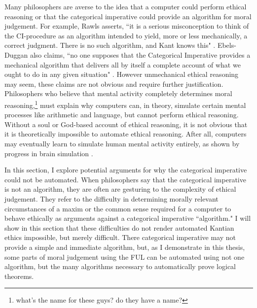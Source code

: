 %
\begin{isabellebody}%
%
%
\isadelimtheory
%
\endisadelimtheory
%
\isatagtheory
%
\endisatagtheory
{\isafoldtheory}%
%
\isadelimtheory
%
\endisadelimtheory
%
\isadelimdocument
%
\endisadelimdocument
%
\isatagdocument
%
\isamarkuptrue%
%
\endisatagdocument
{\isafolddocument}%
%
\isadelimdocument
%
\endisadelimdocument
%
\begin{isamarkuptext}%
Many philosophers are averse to the idea that a computer could perform ethical 
reasoning or that the categorical imperative could provide an algorithm for
moral judgement. For example, Rawls asserts, ``it is a serious misconception to think of the CI-procedure 
as an algorithm intended to yield, more or less mechanically, a correct judgment. There is no such 
algorithm, and Kant knows this" \citep[166]{rawlslectures}. Ebels-Duggan also claims, ``no one supposes that the Categorical
Imperative provides a mechanical algorithm that delivers all by itself a complete account of what we 
ought to do in any given situation" \citep[174]{ebelsduggan}. However unmechanical ethical reasoning
may seem, these claims are not obvious and require further justification. Philosophers who believe 
that mental activity completely determines moral reasoning,\footnote{what's the name for these
guys? do they have a name?} must explain why computers can, in theory, simulate certain mental processes like arithmetic 
and language, but cannot perform ethical reasoning. Without a soul or God-based account of ethical reasoning, 
it is not obvious that it is theoretically impossible to automate ethical reasoning. After all, computers may eventually 
learn to simulate human mental activity entirely, as shown by progress in brain simulation \citep{brainsimulation}. 

In this section,
I explore potential arguments for why the categorical imperative could not be automated. When 
philosophers say that the categorical imperative is not an algorithm, they are often are gesturing to the complexity
of ethical judgement. They refer to the difficulty in determining morally relevant circumstances of a maxim or the common 
sense required for a computer to behave ethically as arguments against a categorical imperative ``algorithm." 
I will show in this section that these difficulties do not render automated Kantian ethics impossible, but 
merely difficult. There categorical imperative may not provide a simple and immediate algorithm, but, as
I demonstrate in this thesis, some parts of moral judgement using the FUL can be automated using not one
algorithm, but the many algorithms necessary to automatically prove logical theorems.


\end{isamarkuptext}
\end{isabellebody}
